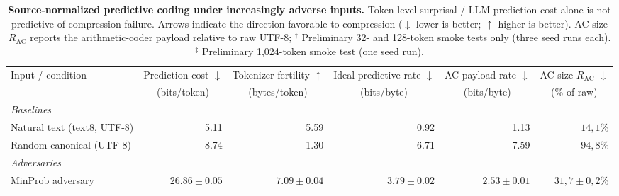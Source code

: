 \begin{table}[t]

\centering

\caption{
\textbf{Source-normalized predictive coding under increasingly adverse inputs.} Token-level surprisal / LLM prediction cost alone is not predictive of compression failure. Arrows indicate the direction favorable to compression ($\downarrow$ lower is better; $\uparrow$ higher is better). AC size $R_{\mathrm{AC}}$ reports the arithmetic-coder payload relative to raw UTF-8; $^\dagger$ Preliminary 32- and 128-token smoke tests only (three seed runs each).
$^\ddagger$ Preliminary 1,024-token smoke test (one seed run).
}

\label{tab:decisive}

\small
\setlength{\tabcolsep}{3.2pt}

\begin{tabular}{lrrrrr}

\toprule

\multicolumn{1}{l}{Input / condition} &
\multicolumn{1}{c}{Prediction cost $\downarrow$} &
\multicolumn{1}{c}{Tokenizer fertility $\uparrow$} &
\multicolumn{1}{c}{Ideal predictive rate $\downarrow$} &
\multicolumn{1}{c}{AC payload rate $\downarrow$} &
\multicolumn{1}{c}{AC size $R_{\mathrm{AC}}$ $\downarrow$} \\

\multicolumn{1}{l}{} &
\multicolumn{1}{c}{\footnotesize (bits/token)} &
\multicolumn{1}{c}{\footnotesize (bytes/token)} &
\multicolumn{1}{c}{\footnotesize (bits/byte)} &
\multicolumn{1}{c}{\footnotesize (bits/byte)} &
\multicolumn{1}{c}{\footnotesize (\% of raw)} \\

\midrule

\multicolumn{6}{l}{\textit{Baselines}} \\

Natural text (text8, UTF-8)
    & 5.11
    & 5.59
    & 0.92
    & 1.13
    & $14{,}1\%$ \\

Random canonical (UTF-8)
    & 8.74
    & 1.30
    & 6.71
    & 7.59
    & $94{,}8\%$ \\

\midrule

\multicolumn{6}{l}{\textit{Adversaries}} \\

MinProb adversary
    & $26.86 \pm 0.05$
    & $7.09 \pm 0.04$
    & $3.79 \pm 0.02$
    & $2.53 \pm 0.01$
    & $31{,}7 \pm 0{,}2\%$ \\


\end{tabular}
\end{table}
